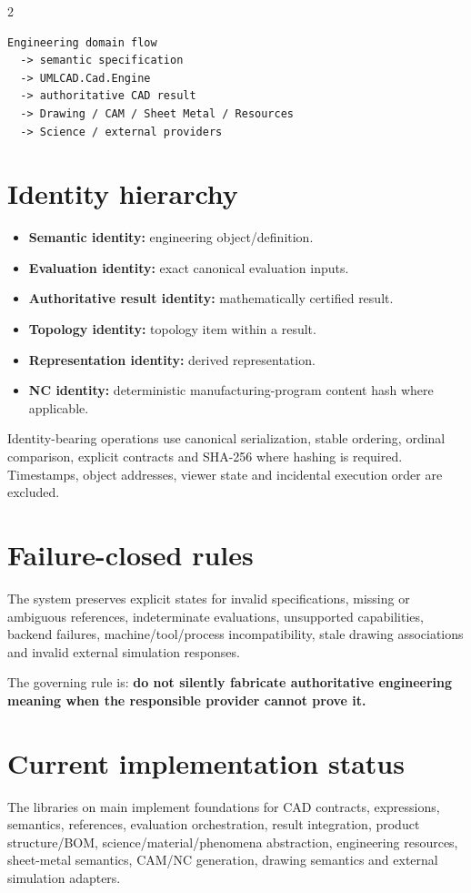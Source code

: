 \documentclass[10pt,a4paper]{article}
\begin{document}
\begin{multicols}{2}
\begin{lstlisting}
Engineering domain flow
  -> semantic specification
  -> UMLCAD.Cad.Engine
  -> authoritative CAD result
  -> Drawing / CAM / Sheet Metal / Resources
  -> Science / external providers
\end{lstlisting}

\section{Identity hierarchy}
\begin{itemize}
\item \textbf{Semantic identity:} engineering object/definition.
\item \textbf{Evaluation identity:} exact canonical evaluation inputs.
\item \textbf{Authoritative result identity:} mathematically certified result.
\item \textbf{Topology identity:} topology item within a result.
\item \textbf{Representation identity:} derived representation.
\item \textbf{NC identity:} deterministic manufacturing-program content hash where applicable.
\end{itemize}

Identity-bearing operations use canonical serialization, stable ordering, ordinal comparison, explicit contracts and SHA-256 where hashing is required. Timestamps, object addresses, viewer state and incidental execution order are excluded.

\section{Failure-closed rules}
The system preserves explicit states for invalid specifications, missing or ambiguous references, indeterminate evaluations, unsupported capabilities, backend failures, machine/tool/process incompatibility, stale drawing associations and invalid external simulation responses.

The governing rule is: \textbf{do not silently fabricate authoritative engineering meaning when the responsible provider cannot prove it.}

\section{Current implementation status}
The libraries on main implement foundations for CAD contracts, expressions, semantics, references, evaluation orchestration, result integration, product structure/BOM, science/material/phenomena abstraction, engineering resources, sheet-metal semantics, CAM/NC generation, drawing semantics and external simulation adapters.


\end{multicols}
\end{document}
